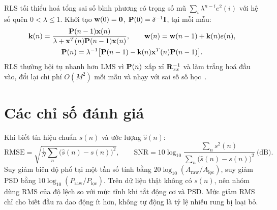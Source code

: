 \documentclass[../main.tex]{subfiles}
\begin{document}
RLS tối thiểu hoá tổng sai số bình phương có trọng số mũ $\sum_{i}\lambda^{n-i}e^2(i)$ với hệ số quên $0<\lambda\le1$. Khởi tạo $\mathbf{w}(0)=\mathbf{0}$, $\mathbf{P}(0)=\delta^{-1}\mathbf{I}$, tại mỗi mẫu:
\begin{equation}
\begin{gathered}
\mathbf{k}(n)=\frac{\mathbf{P}(n-1)\mathbf{x}(n)}{\lambda+\mathbf{x}^T(n)\mathbf{P}(n-1)\mathbf{x}(n)},\qquad
\mathbf{w}(n)=\mathbf{w}(n-1)+\mathbf{k}(n)e(n),\\
\mathbf{P}(n)=\lambda^{-1}\big[\mathbf{P}(n-1)-\mathbf{k}(n)\mathbf{x}^T(n)\mathbf{P}(n-1)\big].
\end{gathered}
\label{eq:rls}
\end{equation}
RLS thường hội tụ nhanh hơn LMS vì $\mathbf{P}(n)$ xấp xỉ $\mathbf{R}_{xx}^{-1}$ và làm trắng hoá đầu vào, đổi lại chi phí $O(M^2)$ mỗi mẫu và nhạy với sai số số học~\cite{haykin2014adaptive,sayed2003fundamentals}.

\section{Các chỉ số đánh giá}
\label{sec:metrics}

Khi biết tín hiệu chuẩn $s(n)$ và ước lượng $\hat{s}(n)$:
\begin{equation}
\mathrm{RMSE}=\sqrt{\tfrac{1}{N}\textstyle\sum_{n}\big(\hat{s}(n)-s(n)\big)^2},\qquad
\mathrm{SNR}=10\log_{10}\dfrac{\sum_n s^2(n)}{\sum_n\big(\hat{s}(n)-s(n)\big)^2}\ \text{(dB)}.
\end{equation}
Suy giảm biên độ phổ tại một tần số tính bằng $20\log_{10}(A_{\text{raw}}/A_{\text{lọc}})$, suy giảm PSD bằng $10\log_{10}(P_{\text{raw}}/P_{\text{lọc}})$. Trên dữ liệu thật không có $s(n)$, nên nhóm dùng RMS của độ lệch so với mức tĩnh khi tắt động cơ và PSD. Mức giảm RMS chỉ cho biết đầu ra dao động ít hơn, không tự động là tỷ lệ nhiễu rung bị loại bỏ.
\end{document}
